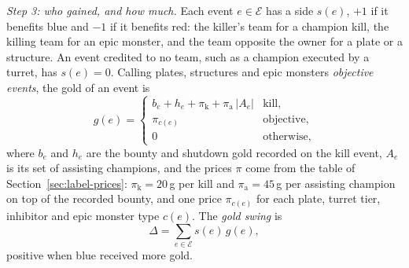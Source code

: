 \emph{Step 3: who gained, and how much.} Each event $e \in \mathcal{E}$ has a side $s(e)$, $+1$ if
it benefits blue and $-1$ if it benefits red: the killer's team for a champion kill, the killing team
for an epic monster, and the team opposite the owner for a plate or a structure. An event credited to
no team, such as a champion executed by a turret, has $s(e) = 0$. Calling plates, structures and epic
monsters \emph{objective events}, the gold of an event is
\begin{equation}\label{eq:label-gold}
g(e) = \begin{cases}
b_e + h_e + \pi_{\mathrm{k}} + \pi_{\mathrm{a}}\,|A_e| & \text{kill},\\
\pi_{c(e)} & \text{objective},\\
0 & \text{otherwise},
\end{cases}
\end{equation}
where $b_e$ and $h_e$ are the bounty and shutdown gold recorded on the kill event, $A_e$ is its set of
assisting champions, and the prices $\pi$ come from the table of Section~\ref{sec:label-prices}:
$\pi_{\mathrm{k}} = 20$\,g per kill and $\pi_{\mathrm{a}} = 45$\,g per assisting champion on top of the
recorded bounty, and one price $\pi_{c(e)}$ for each plate, turret tier, inhibitor and epic monster
type $c(e)$. The \emph{gold swing} is
\begin{equation}\label{eq:label-swing}
\Delta = \sum_{e \in \mathcal{E}} s(e)\, g(e),
\end{equation}
positive when blue received more gold.

